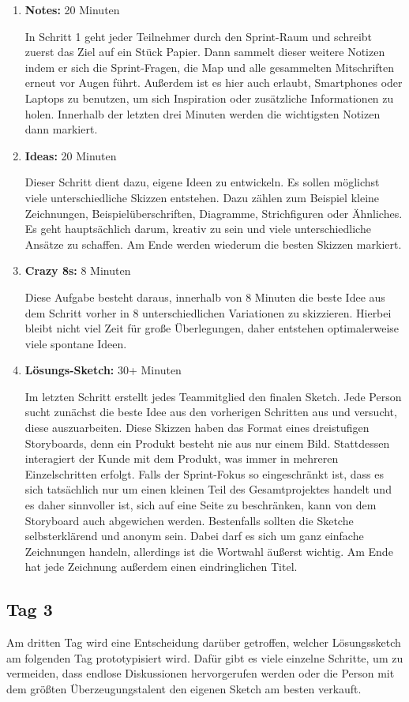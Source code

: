 \begin{enumerate}
	\item \textbf{Notes:} 20 Minuten
	
	In Schritt 1 geht jeder Teilnehmer durch den Sprint-Raum und schreibt zuerst das Ziel auf ein Stück Papier. Dann sammelt dieser weitere Notizen indem er sich die Sprint-Fragen, die Map und alle gesammelten Mitschriften erneut vor Augen führt. Außerdem ist es hier auch erlaubt, Smartphones oder Laptops zu benutzen, um sich Inspiration oder zusätzliche Informationen zu holen. Innerhalb der letzten drei Minuten werden die wichtigsten Notizen dann markiert.
	\item \textbf{Ideas:} 20 Minuten
	
	Dieser Schritt dient dazu, eigene Ideen zu entwickeln. Es sollen möglichst viele unterschiedliche Skizzen entstehen. Dazu zählen zum Beispiel kleine Zeichnungen, Beispielüberschriften, Diagramme, Strichfiguren oder Ähnliches. Es geht hauptsächlich darum, kreativ zu sein und viele unterschiedliche Ansätze zu schaffen. Am Ende werden wiederum die besten Skizzen markiert.
	\item \textbf{Crazy 8s:} 8 Minuten
	
	Diese Aufgabe 	besteht daraus, innerhalb von 8 Minuten die beste Idee aus dem Schritt vorher in 8 unterschiedlichen Variationen zu skizzieren. Hierbei bleibt nicht viel Zeit für große Überlegungen, daher entstehen optimalerweise viele spontane Ideen.
	\item \textbf{Lösungs-Sketch:} 30+ Minuten
	
	Im letzten Schritt erstellt jedes Teammitglied den finalen Sketch. Jede Person sucht zunächst die beste Idee aus den vorherigen Schritten aus und versucht, diese auszuarbeiten. Diese Skizzen haben das Format eines dreistufigen Storyboards, denn ein Produkt besteht nie aus nur einem Bild. Stattdessen interagiert der Kunde mit dem Produkt, was immer in mehreren Einzelschritten erfolgt. Falls der Sprint-Fokus so eingeschränkt ist, dass es sich tatsächlich nur um einen kleinen Teil des Gesamtprojektes handelt und es daher sinnvoller ist, sich auf eine Seite zu beschränken, kann von dem Storyboard auch abgewichen werden. Bestenfalls sollten die Sketche selbsterklärend und anonym sein. Dabei darf es sich um ganz einfache Zeichnungen handeln, allerdings ist die Wortwahl äußerst wichtig. Am Ende hat jede Zeichnung außerdem einen eindringlichen Titel.
\end{enumerate}

\subsection*{Tag 3}
Am dritten Tag wird eine Entscheidung darüber getroffen, welcher Lösungssketch am folgenden Tag prototypisiert wird. Dafür gibt es viele einzelne Schritte, um zu vermeiden, dass endlose Diskussionen hervorgerufen werden oder die Person mit dem größten Überzeugungstalent den eigenen Sketch am besten verkauft.

